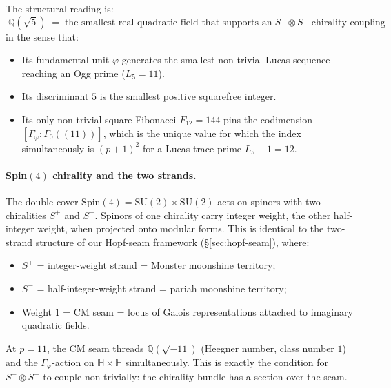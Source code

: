 \documentclass[11pt,a4paper]{article}
\theoremstyle{plain}
\theoremstyle{definition}
\theoremstyle{remark}
\numberwithin{equation}{section}
\providecommand{\Qp}{\ensuremath{\mathbb{Q}(\sqrt{5})}}
\providecommand{\Gphi}{\ensuremath{\Gamma_{\varphi}}}
\begin{document}
The structural reading is:
\[
  \boxed{\;\Qp \;=\; \text{the smallest real quadratic field that supports an}\;
  S^{+}\!\otimes\!S^{-}\;\text{chirality coupling}\;}
\]
in the sense that:
\begin{itemize}\setlength{\itemsep}{0pt}
\item Its fundamental unit $\varphi$ generates the smallest non-trivial Lucas
  sequence reaching an Ogg prime ($L_{5}=11$).
\item Its discriminant $5$ is the smallest positive squarefree integer.
\item Its only non-trivial square Fibonacci $F_{12}=144$ pins the codimension
  $[\Gphi:\Gamma_{0}((11))]$, which is the unique value for which the
  index simultaneously is $(p+1)^{2}$ for a Lucas-trace prime $L_{5}+1=12$.
\end{itemize}

\paragraph{Spin$(4)$ chirality and the two strands.}
The double cover $\mathrm{Spin}(4) = \mathrm{SU}(2)\times\mathrm{SU}(2)$ acts on
spinors with two chiralities $S^{+}$ and $S^{-}$.  Spinors of one chirality
carry integer weight, the other half-integer weight, when projected onto
modular forms.  This is identical to the two-strand structure of our
Hopf-seam framework (\S\ref{sec:hopf-seam}), where:
\begin{itemize}\setlength{\itemsep}{0pt}
\item $S^{+}$ = integer-weight strand = Monster moonshine territory;
\item $S^{-}$ = half-integer-weight strand = pariah moonshine territory;
\item Weight $1$ = CM seam = locus of Galois representations attached to
  imaginary quadratic fields.
\end{itemize}

At $p=11$, the CM seam threads $\mathbb{Q}(\sqrt{-11})$ (Heegner number,
class number $1$) and the $\Gphi$-action on $\mathbb H\times\mathbb H$
simultaneously.  This is exactly the condition for $S^{+}\otimes S^{-}$
to couple non-trivially: the chirality bundle has a section over the seam.
\end{document}
